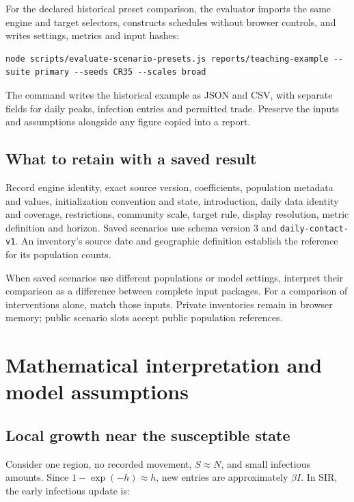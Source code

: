 \documentclass[11pt,a4paper]{article}
\begin{document}
For the declared historical preset comparison, the evaluator imports the
same engine and target selectors, constructs schedules without browser
controls, and writes settings, metrics and input hashes:

\begin{verbatim}
node scripts/evaluate-scenario-presets.js reports/teaching-example --suite primary --seeds CR35 --scales broad
\end{verbatim}

The command writes the historical example as JSON and CSV, with separate
fields for daily peaks, infection entries and permitted trade. Preserve
the inputs and assumptions alongside any figure copied into a report.

\subsection{What to retain with a saved
result}\label{what-to-retain-with-a-saved-result}

Record engine identity, exact source version, coefficients, population
metadata and values, initialization convention and state, introduction,
daily data identity and coverage, restrictions, community scale, target
rule, display resolution, metric definition and horizon. Saved scenarios
use schema version 3 and \texttt{daily-contact-v1}. An inventory's
source date and geographic definition establish the reference for its
population counts.

When saved scenarios use different populations or model settings,
interpret their comparison as a difference between complete input
packages. For a comparison of interventions alone, match those inputs.
Private inventories remain in browser memory; public scenario slots
accept public population references.

\section{Mathematical interpretation and model
assumptions}\label{mathematical-interpretation-and-model-assumptions}

\subsection{Local growth near the susceptible
state}\label{local-growth-near-the-susceptible-state}

Consider one region, no recorded movement, \(S \approx  N\), and small
infectious amounts. Since \(1-\exp(-h) \approx  h\), new entries are
approximately \(\beta I\). In SIR, the early infectious update is:
\end{document}
